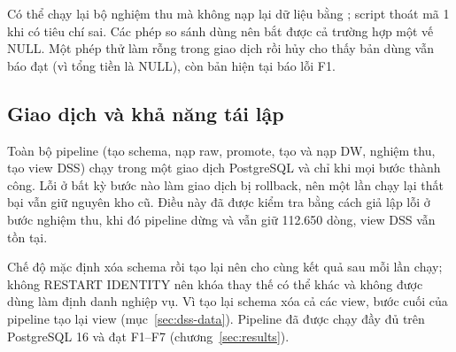 Có thể chạy lại bộ nghiệm thu mà không nạp lại dữ liệu bằng ; script thoát mã 1 khi có tiêu chí sai. Các phép so sánh dùng  nên bắt được cả trường hợp một vế NULL. Một phép thử làm rỗng  trong giao dịch rồi hủy cho thấy bản dùng \code{<>} vẫn báo đạt (vì tổng tiền là NULL), còn bản hiện tại báo lỗi F1.

\subsection{Giao dịch và khả năng tái lập}
Toàn bộ pipeline (tạo schema, nạp raw, promote, tạo và nạp DW, nghiệm thu, tạo view DSS) chạy trong một giao dịch PostgreSQL và chỉ  khi mọi bước thành công. Lỗi ở bất kỳ bước nào làm giao dịch bị rollback, nên một lần chạy lại thất bại vẫn giữ nguyên kho cũ. Điều này đã được kiểm tra bằng cách giả lập lỗi ở bước nghiệm thu, khi đó pipeline dừng và  vẫn giữ 112.650 dòng, view DSS vẫn tồn tại.

Chế độ mặc định xóa schema rồi tạo lại nên cho cùng kết quả sau mỗi lần chạy;  không RESTART IDENTITY nên khóa thay thế có thể khác và không được dùng làm định danh nghiệp vụ. Vì tạo lại schema  xóa cả các view, bước cuối của pipeline tạo lại view  (mục~\ref{sec:dss-data}). Pipeline đã được chạy đầy đủ trên PostgreSQL 16 và đạt F1--F7 (chương~\ref{sec:results}).
